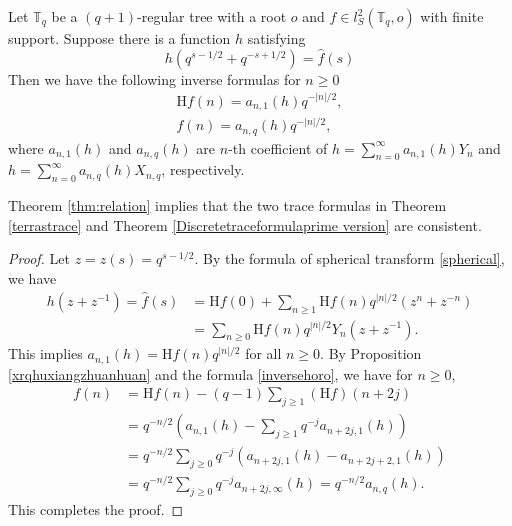\documentclass{article}
\begin{document}
\begin{theorem}\label{thm:relation}
Let $\mathbb{T}_q$ be a $(q+1)$-regular tree with a root $o$ and $f \in l^2_S(\mathbb{T}_q, o)$ with finite support. Suppose there is a function $h$ satisfying
\[h\left(q^{s-1/2}+q^{-s+1/2}\right)=\widehat{f}(s)\]
Then we have the following inverse formulas for $n\geq 0$
\begin{equation}\label{relationbetweentwotrace}
\begin{gathered}
\mathrm{H}f(n)=a_{n,1}(h)q^{-|n|/2}, \\
f(n)=a_{n,q}(h)q^{-|n|/2},
\end{gathered}
\end{equation}
where $a_{n,1}(h)$ and $a_{n,q}(h)$ are $n$-th coefficient of $h=\sum_{n=0}^{\infty}a_{n,1}(h)Y_{n}$ and $h=\sum_{n=0}^{\infty}a_{n,q}(h)X_{n,q}$, respectively. 
\end{theorem}
Theorem \ref{thm:relation} implies that the two trace formulas in Theorem \eqref{terrastrace} and Theorem \eqref{Discretetraceformulaprime version} are consistent.

\begin{proof}
Let $z=z(s)=q^{s-1/2}$.
By the formula of spherical transform \eqref{spherical}, we have
\begin{equation}
\begin{aligned}
h(z+z^{-1})=\widehat{f}(s)&=\mathrm{H}f(0)+\sum_{n \geq 1} \mathrm{H} f(n) q^{|n| / 2} (z^n+z^{-n})\\
&=\sum_{n \geq 0}\mathrm{H}f(n)q^{|n|/2}Y_{n}(z+z^{-1}).
\end{aligned}
\end{equation}
This implies $a_{n,1}(h)=\mathrm{H}f(n)q^{|n|/2}$ for all $n\geq 0$. By Proposition \ref{xrqhuxiangzhuanhuan} and the formula \eqref{inversehoro},  we have for $n\geq 0$,
\begin{equation}
\begin{aligned}
f(n)&=\mathrm{H} f(n)-(q-1) \sum_{j \geq 1}(\mathrm{H} f)(n+2 j)\\
    &=q^{-n/2}\left(a_{n,1}(h)-\sum_{j\geq 1}q^{-j}a_{n+2j,1}(h)\right)\\
    &=q^{-n/2}\sum_{j\geq 0}q^{-j}\left(a_{n+2j,1}(h)-a_{n+2j+2,1}(h)\right)\\
    &=q^{-n/2}\sum_{j\geq 0}q^{-j}a_{n+2j,\infty}(h)=q^{-n/2}a_{n,q}(h).
\end{aligned}
\end{equation}
This completes the proof.
\end{proof}
\end{document}

